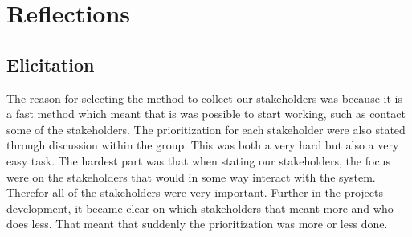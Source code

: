 \documentclass[10pt,a4paper]{article}
\begin{document}
\section{Reflections}

\subsection{Elicitation}
The reason for selecting the method to collect our stakeholders was because it is a fast method which meant that is was possible to start working, such as contact some of the stakeholders. The prioritization for each stakeholder were also stated through discussion within the group. This was both a very hard but also a very easy task. The hardest part was that when stating our stakeholders, the focus were on the stakeholders that would in some way interact with the system. Therefor all of the stakeholders were very important. Further in the projects development, it became clear on which stakeholders that meant more and who does less. That meant that suddenly the prioritization was more or less done. 
\end{document}
